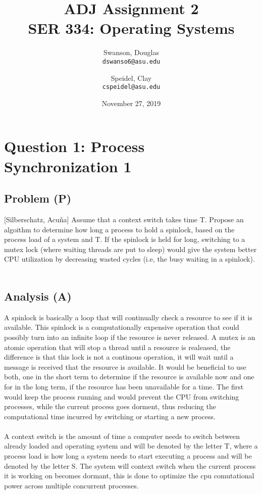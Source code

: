 \documentclass[12pt]{article}
\title{ADJ Assignment 2 \\ SER 334: Operating Systems}     %
\author{                        %
    Swanson, Douglas \\
    \texttt{dswanso6@asu.edu}
    \and
    Speidel, Clay \\
    \texttt{cspeidel@asu.edu}
    }
\date{November 27, 2019}        %
\begin{document}
    \maketitle
    \section{Question 1: Process Synchronization 1}
        \subsection{Problem (P)}
        [Silberschatz, Acuña] Assume that a context switch takes time T. Propose an algoithm to determine
        how long a process to hold a spinlock, based on the process load of a system and T. If the spinlock is
        held for long, switching to a mutex lock (where waiting threads are put to sleep) would give the system
        better CPU utilization by decreasing wasted cycles (i.e, the busy waiting in a spinlock). \\
        \\
        \subsection{Analysis (A)}
        A spinlock is basically a loop that will continually check a resource to see if it is available. 
        This spinlock is a computationally expensive operation that could possibly turn into an infinite 
        loop if the resource is never released. A mutex is an atomic operation that will stop a thread 
        until a resource is realeased, the difference is that this lock is not a continous operation, 
        it will wait until a message is received that the resource is available. It would be beneficial
        to use both, one in the short term to determine if the resource is available now and one for in the 
        long term, if the resource has been unavailable for a time. The first would keep the process running
        and would prevent the CPU from switching processes, while the current process goes dorment, thus reducing
        the computational time incurred by switching or starting a new process.\\
        \\
        A context switch is the amount of time a computer needs to switch between already loaded and operating system
        and will be denoted by the letter T, where a process load is how long a system needs to start executing a 
        process and will be denoted by the letter S. The system will context switch when the current process it is
        working on becomes dormant, this is done to optimize the cpu comutational power across multiple concurrent
        processes. \\
        \\
\end{document}
